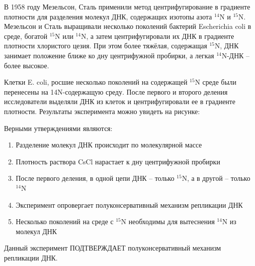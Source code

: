 
В 1958 году Мезельсон, Сталь применили метод
центрифугирование в градиенте плотности для разделения молекул ДНК, содержащих
изотопы азота $^{14}$N и $^{15}$N. Мезельсон и Сталь выращивали
несколько поколений бактерий Escherichia
coli в среде, богатой $^{15}$N или $^{14}$N, а затем
центрифугировали их ДНК в градиенте плотности хлористого цезия. При этом более
тяжёлая, содержащая $^{15}$N, ДНК занимает положение ближе ко дну
центрифужной пробирки, а легкая $^{14}$N-ДНК – более высокое. 

Клетки E. coli,
росшие несколько поколений на содержащей $^{15}$N среде были перенесены
на 14N-содержащую среду. После первого и второго деления
исследователи выделяли ДНК из клеток и центрифугировали ее в градиенте плотности.
Результаты эксперимента можно увидеть на рисунке:


Верными утверждениями являются:

\begin{enumerate}
    \item Разделение молекул ДНК происходит по молекулярной массе
    \item Плотность раствора CsCl нарастает к дну центрифужной пробирки
    \item После первого деления, в одной цепи ДНК – только $^{15}$N, а в другой – только $^{14}$N
    \item Эксперимент опровергает полуконсервативный механизм репликации ДНК
    \item Несколько поколений на среде с $^{15}$N необходимы для вытеснения $^{14}$N из молекул ДНК
\end{enumerate}

\explanationSection

Данный эксперимент ПОДТВЕРЖДАЕТ полуконсервативный механизм репликации ДНК.

